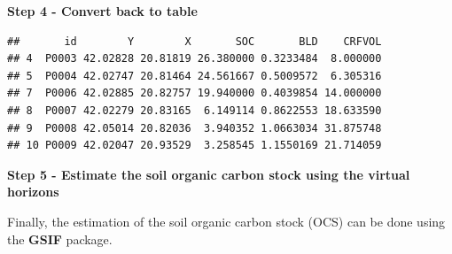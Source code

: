 \documentclass[10pt,b5paper,]{book}
\newenvironment{Shaded}{\begin{snugshade}}{\end{snugshade}}
\newcommand{\CommentTok}[1]{\textcolor[rgb]{0.56,0.35,0.01}{\textit{#1}}}
\newcommand{\DataTypeTok}[1]{\textcolor[rgb]{0.13,0.29,0.53}{#1}}
\newcommand{\DecValTok}[1]{\textcolor[rgb]{0.00,0.00,0.81}{#1}}
\newcommand{\KeywordTok}[1]{\textcolor[rgb]{0.13,0.29,0.53}{\textbf{#1}}}
\newcommand{\NormalTok}[1]{#1}
\newcommand{\OperatorTok}[1]{\textcolor[rgb]{0.81,0.36,0.00}{\textbf{#1}}}
\newcommand{\StringTok}[1]{\textcolor[rgb]{0.31,0.60,0.02}{#1}}
\theoremstyle{definition}
\theoremstyle{definition}
\theoremstyle{definition}
\theoremstyle{remark}
\begin{document}
\textbf{Step 4 - Convert back to table}

\begin{Shaded}
\end{Shaded}

\begin{verbatim}
##       id        Y        X       SOC       BLD    CRFVOL
## 4  P0003 42.02828 20.81819 26.380000 0.3233484  8.000000
## 5  P0004 42.02747 20.81464 24.561667 0.5009572  6.305316
## 7  P0006 42.02885 20.82757 19.940000 0.4039854 14.000000
## 8  P0007 42.02279 20.83165  6.149114 0.8622553 18.633590
## 9  P0008 42.05014 20.82036  3.940352 1.0663034 31.875748
## 10 P0009 42.02047 20.93529  3.258545 1.1550169 21.714059
\end{verbatim}

\textbf{Step 5 - Estimate the soil organic carbon stock using the
virtual horizons}

Finally, the estimation of the soil organic carbon stock (OCS) can be
done using the \textbf{GSIF} package.
\end{document}
